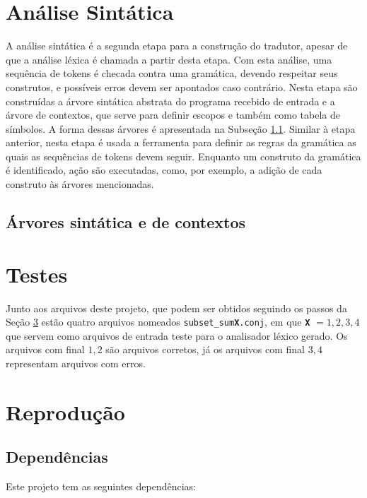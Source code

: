 \documentclass{llncs}
\begin{document}
\section{Análise Sintática}
\label{sec:analise_sintatica}
A análise sintática é a segunda etapa para a construção do tradutor, apesar de que a análise léxica é chamada a partir desta etapa. Com esta análise, uma sequência de tokens é checada contra uma gramática, devendo respeitar seus construtos, e possíveis erros devem ser apontados caso contrário. Nesta etapa são construídas a árvore sintática abstrata do programa recebido de entrada e a árvore de contextos, que serve para definir escopos e também como tabela de símbolos. A forma dessas árvores é apresentada na Subseção \ref{subsection:arvores}. Similar à etapa anterior, nesta etapa é usada a ferramenta  para definir as regras da gramática as quais as sequências de tokens devem seguir. Enquanto um construto da gramática é identificado, ação são executadas, como, por exemplo, a adição de cada construto às árvores mencionadas.

\subsection{Árvores sintática e de contextos}
\label{subsection:arvores}

\section{Testes}
\label{sec:testes}

Junto aos arquivos deste projeto, que podem ser obtidos seguindo os passos da Seção \ref{sec:reproducao} estão quatro arquivos nomeados \texttt{subset\_sum\textbf{X}.conj}, em que {\bf\tt X} $= 1,2,3,4$ que servem como arquivos de entrada teste para o analisador léxico gerado. Os arquivos com final $1,2$ são arquivos corretos, já os arquivos com final $3,4$ representam arquivos com erros.

\section{Reprodução}
\label{sec:reproducao}

\subsection{Dependências}

Este projeto tem as seguintes dependências:
\end{document}
